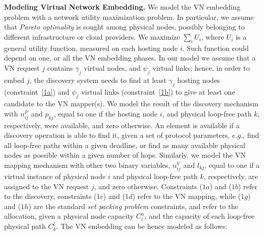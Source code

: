 \documentclass[a4paper, 10pt, conference]{ieeeconf}
\begin{document}
\noindent
{\bf Modeling Virtual Network Embedding.}
We model the VN embedding problem with a network utility maximization problem. In particular, we assume that {\it Pareto optimality} is sought among physical nodes, possibly belonging to different infrastructure or cloud providers. We maximize 
$\sum_i U_i$, where $U_i$ is a general utility function, measured on each hosting node $i$. Such function could depend on one, or all the VN embedding phases. In our model we assume that a VN request $j$ contains $\gamma_j$ virtual nodes, and $\psi_j$ virtual links;  hence, in order to embed $j$, the discovery system needs  to find at least $\gamma_j$ hosting nodes (constraint~\ref{1a}) and $\psi_j$ virtual links (constraint~\ref{1b}) to give at least one candidate to the VN mapper(s).
We model the result of the discovery mechanism with $n_{ij}^{P}$ and $p_{kj}$, equal to one if the hosting node $i$, and physical loop-free path $k$, respectively, were available, and zero otherwise. An element is available if a discovery operation is able to find it, given a set of protocol parameters, $e.g.$, find all loop-free paths within a given deadline, or find as many available physical nodes as possible within a given number of hops.  Similarly, we model the VN mapping mechanism with other two binary variables, $n_{ij}^{V}$  and $l_{kj}$, equal to one if a virtual instance of physical node $i$ and physical loop-free path $k$, respectively, are assigned to the VN request $j$, and zero otherwise.
Constraints ($1a$) and ($1b$) refer to the discovery, constraints ($1c$) and ($1d$) refer to the VN mapping, while ($1g$) and ($1h$) are the standard {\it set packing problem} constraints, and refer to the allocation, given a physical node capacity $C^{n}_i$, and the capacity of each loop-free physical path $C^{l}_k$. The VN embedding can be hence modeled as follows: 
\vspace{-2mm}
\end{document}
